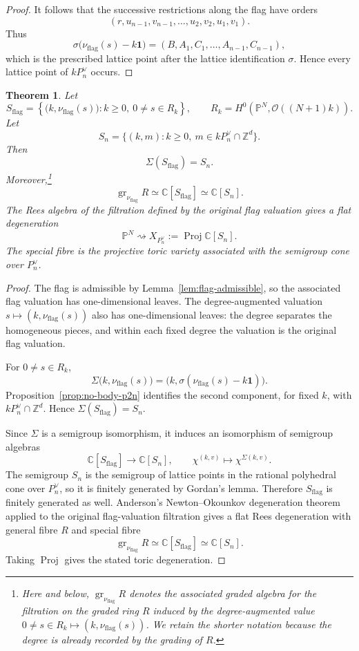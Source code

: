 \documentclass{article}
\newtheorem{thm}{Theorem}[section]
\newcommand{\ZZ}{\mathbb{Z}}
\newcommand{\CC}{\mathbb{C}}
\newcommand{\PP}{\mathbb{P}}
\begin{document}
\begin{proof}
It follows that the successive restrictions along the flag have orders
\[
(r,u_{n-1},v_{n-1},\ldots,u_2,v_2,u_1,v_1).
\]
Thus
\[
\sigma\bigl(\nu_{\mathrm{flag}}(s)-k\mathbf 1\bigr)
=
(B,A_1,C_1,\ldots,A_{n-1},C_{n-1}),
\]
which is the prescribed lattice point after the lattice identification \(\sigma\). Hence every lattice point of \(kP_n^\vee\) occurs.
\end{proof}

\begin{thm}\label{thm:no-toric-degeneration}
Let
\[
S_{\mathrm{flag}}
=
\left\{
\bigl(k,\nu_{\mathrm{flag}}(s)\bigr):
k\ge0,\ 0\ne s\in R_k
\right\},
\qquad
R_k=H^0(\PP^N,\mathcal O((N+1)k)).
\]
Let
\[
S_n=\{(k,m):k\ge0,\ m\in kP_n^\vee\cap\ZZ^d\}.
\]
Then
\[
\Sigma(S_{\mathrm{flag}})=S_n.
\]
Moreover,\footnote{Here and below, \(\operatorname{gr}_{\nu_{\mathrm{flag}}}R\) denotes the associated graded algebra for the filtration on the graded ring \(R\) induced by the degree-augmented value \(0\ne s\in R_k\mapsto(k,\nu_{\mathrm{flag}}(s))\). We retain the shorter notation because the degree is already recorded by the grading of \(R\).}
\[
\operatorname{gr}_{\nu_{\mathrm{flag}}}R
\simeq \CC[S_{\mathrm{flag}}]\simeq \CC[S_n].
\]
The Rees algebra of the filtration defined by the original flag valuation gives a flat degeneration
\[
\PP^N\rightsquigarrow X_{P_n^\vee}:=\operatorname{Proj}\CC[S_n].
\]
The special fibre is the projective toric variety associated with the semigroup cone over \(P_n^\vee\).
\end{thm}

\begin{proof}
The flag is admissible by Lemma~\ref{lem:flag-admissible}, so the associated flag valuation has one-dimensional leaves. The degree-augmented valuation \(s\mapsto(k,\nu_{\mathrm{flag}}(s))\) also has one-dimensional leaves: the degree separates the homogeneous pieces, and within each fixed degree the valuation is the original flag valuation.

For \(0\ne s\in R_k\),
\[
\Sigma\bigl(k,\nu_{\mathrm{flag}}(s)\bigr)
=
\bigl(k,\sigma(\nu_{\mathrm{flag}}(s)-k\mathbf 1)\bigr).
\]
Proposition~\ref{prop:no-body-p2n} identifies the second component, for fixed \(k\), with \(kP_n^\vee\cap\ZZ^d\). Hence \(\Sigma(S_{\mathrm{flag}})=S_n\).

Since \(\Sigma\) is a semigroup isomorphism, it induces an isomorphism of semigroup algebras
\[
\CC[S_{\mathrm{flag}}]\longrightarrow \CC[S_n],
\qquad
\chi^{(k,v)}\longmapsto \chi^{\Sigma(k,v)}.
\]
The semigroup \(S_n\) is the semigroup of lattice points in the rational polyhedral cone over \(P_n^\vee\), so it is finitely generated by Gordan's lemma. Therefore \(S_{\mathrm{flag}}\) is finitely generated as well. Anderson's Newton--Okounkov degeneration theorem applied to the original flag-valuation filtration gives a flat Rees degeneration with general fibre \(R\) and special fibre
\[
\operatorname{gr}_{\nu_{\mathrm{flag}}}R\simeq\CC[S_{\mathrm{flag}}]\simeq\CC[S_n].
\]
Taking \(\operatorname{Proj}\) gives the stated toric degeneration.
\end{proof}
\end{document}
